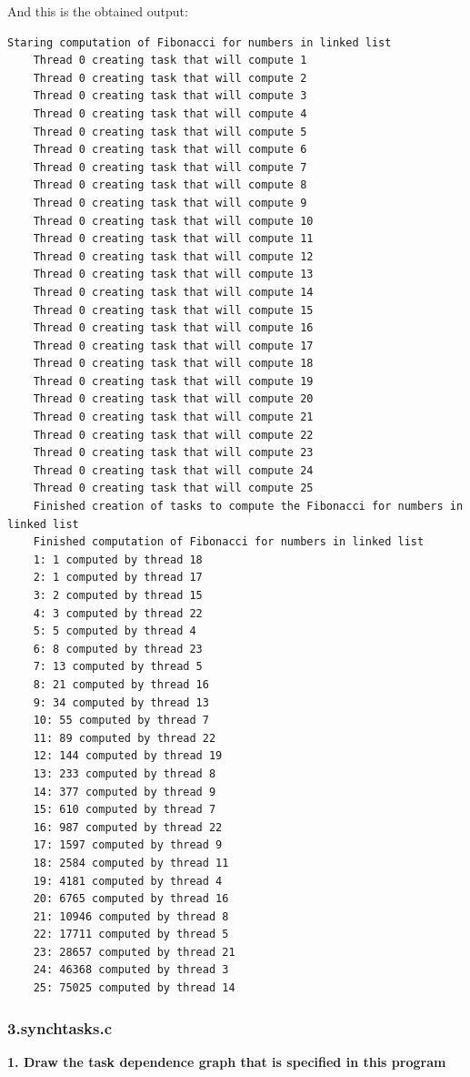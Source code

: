 \documentclass[12]{article}
\begin{document}
And this is the obtained output:
\medskip
\begin{lstlisting}[frame=single]
    Staring computation of Fibonacci for numbers in linked list 
    Thread 0 creating task that will compute 1
    Thread 0 creating task that will compute 2
    Thread 0 creating task that will compute 3
    Thread 0 creating task that will compute 4
    Thread 0 creating task that will compute 5
    Thread 0 creating task that will compute 6
    Thread 0 creating task that will compute 7
    Thread 0 creating task that will compute 8
    Thread 0 creating task that will compute 9
    Thread 0 creating task that will compute 10
    Thread 0 creating task that will compute 11
    Thread 0 creating task that will compute 12
    Thread 0 creating task that will compute 13
    Thread 0 creating task that will compute 14
    Thread 0 creating task that will compute 15
    Thread 0 creating task that will compute 16
    Thread 0 creating task that will compute 17
    Thread 0 creating task that will compute 18
    Thread 0 creating task that will compute 19
    Thread 0 creating task that will compute 20
    Thread 0 creating task that will compute 21
    Thread 0 creating task that will compute 22
    Thread 0 creating task that will compute 23
    Thread 0 creating task that will compute 24
    Thread 0 creating task that will compute 25
    Finished creation of tasks to compute the Fibonacci for numbers in linked list 
    Finished computation of Fibonacci for numbers in linked list 
    1: 1 computed by thread 18 
    2: 1 computed by thread 17 
    3: 2 computed by thread 15 
    4: 3 computed by thread 22 
    5: 5 computed by thread 4 
    6: 8 computed by thread 23 
    7: 13 computed by thread 5 
    8: 21 computed by thread 16 
    9: 34 computed by thread 13 
    10: 55 computed by thread 7 
    11: 89 computed by thread 22 
    12: 144 computed by thread 19 
    13: 233 computed by thread 8 
    14: 377 computed by thread 9 
    15: 610 computed by thread 7 
    16: 987 computed by thread 22 
    17: 1597 computed by thread 9 
    18: 2584 computed by thread 11 
    19: 4181 computed by thread 4 
    20: 6765 computed by thread 16 
    21: 10946 computed by thread 8 
    22: 17711 computed by thread 5 
    23: 28657 computed by thread 21 
    24: 46368 computed by thread 3 
    25: 75025 computed by thread 14 
\end{lstlisting}

\subsubsection{3.synchtasks.c}
\textbf{1. Draw the task dependence graph that is specified in this program}
\end{document}
